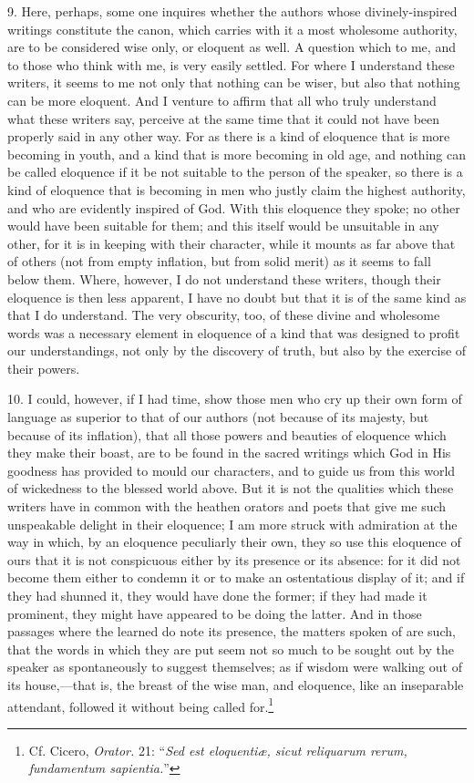 9. Here, perhaps, some one inquires whether the authors whose divinely-inspired writings constitute the canon, which carries with it a most wholesome authority, are to be considered wise only, or eloquent as well. A question which to me, and to those who think with me, is very easily settled. For where I understand these writers, it seems to me not only that nothing can be wiser, but also that nothing can be more eloquent. And I venture to affirm that all who truly understand what these writers say, perceive at the same time that it could not have been properly said in any other way. For as there is a kind of eloquence that is more becoming in youth, and a kind that is more becoming in old age, and nothing can be called eloquence if it be not suitable to the person of the speaker, so there is a kind of eloquence that is becoming in men who justly claim the highest authority, and who are evidently inspired of God. With this eloquence they spoke; no other would have been suitable for them; and this itself would be unsuitable in any other, for it is in keeping with their character, while it mounts as far above that of others (not from empty inflation, but from solid merit) as it seems to fall below them. Where, however, I do not understand these writers, though their eloquence is then less apparent, I have no doubt but that it is of the same kind as that I do understand. The very obscurity, too, of these divine and wholesome words was a necessary element in eloquence of a kind that was designed to profit our understandings, not only by the discovery of truth, but also by the exercise of their powers.

10. I could, however, if I had time, show those men who cry up their own form of language as superior to that of our authors (not because of its majesty, but because of its inflation), that all those powers and beauties of eloquence which they make their boast, are to be found in the sacred writings which God in His goodness has provided to mould our characters, and to guide us from this world of wickedness to the blessed world above. But it is not the qualities which these writers have in common with the heathen orators and poets that give me such unspeakable delight in their eloquence; I am more struck with admiration at the way in which, by an eloquence peculiarly their own, they so use this eloquence of ours that it is not conspicuous either by its presence or its absence: for it did not become them either to condemn it or to make an ostentatious display of it; and if they had shunned it, they would have done the former; if they had made it prominent, they might have appeared to be doing the latter. And in those passages where the learned do note its presence, the matters spoken of are such, that the words in which they are put seem not so much to be sought out by the speaker as spontaneously to suggest themselves; as if wisdom were walking out of its house,—that is, the breast of the wise man, and eloquence, like an inseparable attendant, followed it without being called for.\footnote{Cf. Cicero, \emph{Orator.} 21: “\emph{Sed est eloquentiæ, sicut reliquarum rerum, fundamentum sapientia.}”}


